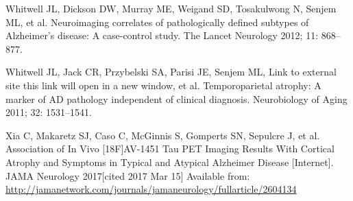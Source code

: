 \documentclass[]{article}
\begin{document}
\hypertarget{ref-whitwell_neuroimaging_2012}{}
Whitwell JL, Dickson DW, Murray ME, Weigand SD, Tosakulwong N, Senjem
ML, et al. Neuroimaging correlates of pathologically defined subtypes of
Alzheimer's disease: A case-control study. The Lancet Neurology 2012;
11: 868--877.

\hypertarget{ref-whitwell_temporoparietal_2011}{}
Whitwell JL, Jack CR, Przybelski SA, Parisi JE, Senjem ML, Link to
external site this link will open in a new window, et al.
Temporoparietal atrophy: A marker of AD pathology independent of
clinical diagnosis. Neurobiology of Aging 2011; 32: 1531--1541.

\hypertarget{ref-xia_association_2017}{}
Xia C, Makaretz SJ, Caso C, McGinnis S, Gomperts SN, Sepulcre J, et al.
Association of In Vivo {[}18F{]}AV-1451 Tau PET Imaging Results With
Cortical Atrophy and Symptoms in Typical and Atypical Alzheimer Disease
{[}Internet{]}. JAMA Neurology 2017{[}cited 2017 Mar 15{]} Available
from:
\url{http://jamanetwork.com/journals/jamaneurology/fullarticle/2604134}
\end{document}
